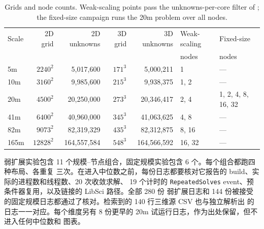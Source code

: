 \documentclass[11pt,a4paper,oneside]{report}
\begin{document}
\begin{table}[htbp]
  \centering
  \caption{Grids and node counts. Weak-scaling points pass the unknowns-per-core filter of
  ; the fixed-size campaign runs the 20m problem over all nodes.}
  \label{tab:fullnode-matrix}
  \small
  \begin{tabular}{lrrrrll}
    \toprule
    Scale & 2D grid & 2D unknowns & 3D grid & 3D unknowns & Weak-scaling & Fixed-size \\
          &         &             &         &             & nodes        & nodes \\
    \midrule
    5m   & $2240^2$  &   5,017,600 & $171^3$ &   5,000,211 & 1      & --- \\
    10m  & $3160^2$  &   9,985,600 & $215^3$ &   9,938,375 & 1, 2   & --- \\
    20m  & $4500^2$  &  20,250,000 & $273^3$ &  20,346,417 & 2, 4   & 1, 2, 4, 8, 16, 32 \\
    41m  & $6400^2$  &  40,960,000 & $345^3$ &  41,063,625 & 4, 8   & --- \\
    82m  & $9073^2$  &  82,319,329 & $435^3$ &  82,312,875 & 8, 16  & --- \\
    165m & $12828^2$ & 164,557,584 & $548^3$ & 164,566,592 & 16, 32 & --- \\
    \bottomrule
  \end{tabular}
\end{table}

弱扩展实验包含 11 个规模--节点组合，固定规模实验包含 6 个。每个组合都跑四种布局、各重复
三次。在进入中位数之前，每份日志都要核对它报告的 build、实际的进程数和线程数、20 次收敛求解、
19 个计时的 \texttt{RepeatedSolves} event、预条件器复用，以及链接的 LibSci 路径。全部 280 份
弱扩展日志和 144 份被接受的固定规模日志都通过了核对。检索到的 140 行三维源 CSV 也与独立解析出
的日志一一对应。每个维度另有 8 份更早的 20m 试运行日志，作为出处保留，但不进入任何中位数和
图表。
\end{document}
